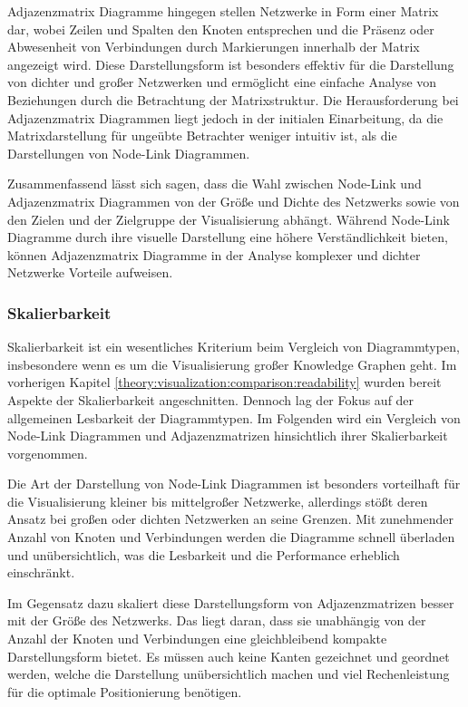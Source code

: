 Adjazenzmatrix Diagramme hingegen stellen Netzwerke in Form einer Matrix dar, wobei Zeilen und Spalten den Knoten entsprechen und die Präsenz oder Abwesenheit von Verbindungen durch Markierungen innerhalb der Matrix angezeigt wird. Diese Darstellungsform ist besonders effektiv für die Darstellung von dichter und großer Netzwerken und ermöglicht eine einfache Analyse von Beziehungen durch die Betrachtung der Matrixstruktur. Die Herausforderung bei Adjazenzmatrix Diagrammen liegt jedoch in der initialen Einarbeitung, da die Matrixdarstellung für ungeübte Betrachter weniger intuitiv ist, als die Darstellungen von Node-Link Diagrammen.

Zusammenfassend lässt sich sagen, dass die Wahl zwischen Node-Link und Adjazenzmatrix Diagrammen von der Größe und Dichte des Netzwerks sowie von den Zielen und der Zielgruppe der Visualisierung abhängt. Während Node-Link Diagramme durch ihre visuelle Darstellung eine höhere Verständlichkeit bieten, können Adjazenzmatrix Diagramme in der Analyse komplexer und dichter Netzwerke Vorteile aufweisen.

\subsubsection{Skalierbarkeit}

Skalierbarkeit ist ein wesentliches Kriterium beim Vergleich von Diagrammtypen, insbesondere wenn es um die Visualisierung großer Knowledge Graphen geht. Im vorherigen Kapitel \ref{theory:visualization:comparison:readability} wurden bereit Aspekte der Skalierbarkeit angeschnitten. Dennoch lag der Fokus auf der allgemeinen Lesbarkeit der Diagrammtypen. Im Folgenden wird ein Vergleich von Node-Link Diagrammen und Adjazenzmatrizen hinsichtlich ihrer Skalierbarkeit vorgenommen.

Die Art der Darstellung von Node-Link Diagrammen ist besonders vorteilhaft für die Visualisierung kleiner bis mittelgroßer Netzwerke, allerdings stößt deren Ansatz bei großen oder dichten Netzwerken an seine Grenzen. Mit zunehmender Anzahl von Knoten und Verbindungen werden die Diagramme schnell überladen und unübersichtlich, was die Lesbarkeit und die Performance erheblich einschränkt.

Im Gegensatz dazu skaliert diese Darstellungsform von Adjazenzmatrizen besser mit der Größe des Netzwerks. Das liegt daran, dass sie unabhängig von der Anzahl der Knoten und Verbindungen eine gleichbleibend kompakte Darstellungsform bietet. Es müssen auch keine Kanten gezeichnet und geordnet werden, welche die Darstellung unübersichtlich machen und viel Rechenleistung für die optimale Positionierung benötigen.

